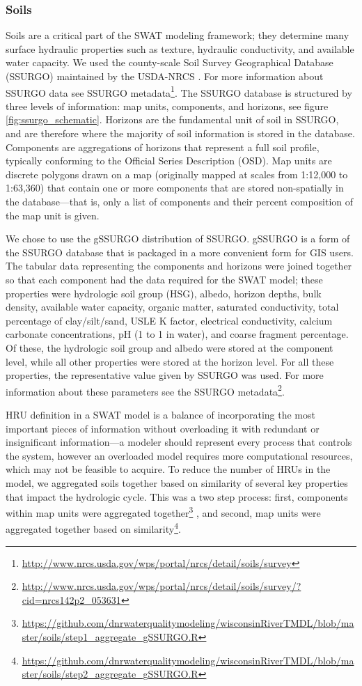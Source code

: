 \subsubsection{Soils}\label{sec:soils}
Soils are a critical part of the SWAT modeling framework; they determine many
surface hydraulic properties such as texture, hydraulic conductivity, and
available water capacity. We used the county-scale Soil Survey Geographical
Database (SSURGO) maintained by the USDA-NRCS \citep{staff_gridded_2014}. For more information about SSURGO
data see SSURGO metadata\footnote{\url{http://www.nrcs.usda.gov/wps/portal/nrcs/detail/soils/survey}}.
The SSURGO database is structured by three levels of information: map units,
components, and horizons, see figure \ref{fig:ssurgo_schematic}. Horizons are the fundamental unit of soil in SSURGO, and are
therefore where the majority of soil information is stored in the database.
Components are aggregations of horizons that represent a full soil profile,
typically conforming to the Official Series Description (OSD). Map units
are discrete polygons drawn on a map (originally mapped at scales from 1:12,000
to 1:63,360) that contain one or more components that are stored non-spatially
in the database---that is, only a list of components and their percent
composition of the map unit is given. 

We chose to use the gSSURGO distribution of SSURGO. gSSURGO is a form of the SSURGO database that is packaged in a more
convenient form for GIS users. The tabular data representing the components and
horizons were joined together so that each component had the data required for
the SWAT model; these properties were hydrologic soil group (HSG), albedo,
horizon depths, bulk density, available water capacity, organic matter,
saturated conductivity, total percentage of clay/silt/sand, USLE K factor,
electrical conductivity, calcium carbonate concentrations, pH (1 to 1 in water),
and coarse fragment percentage. Of these, the hydrologic soil group and albedo
were stored at the component level, while all other properties were stored at
the horizon level. For all these properties, the representative value given by
SSURGO was used. For more information about these parameters see the SSURGO
metadata\footnote{\url{http://www.nrcs.usda.gov/wps/portal/nrcs/detail/soils/survey/?cid=nrcs142p2_053631}}.

HRU definition in a SWAT model is a balance of incorporating the most important
pieces of information without overloading it with redundant or insignificant
information---a modeler should represent every process that controls the system,
however an overloaded model requires more computational resources, which may not
be feasible to acquire. To reduce the number of HRUs in the model, we aggregated
soils together based on similarity of several key properties that impact the
hydrologic cycle. This was a two step process: first, components within map
units were aggregated
together\footnote{\url{https://github.com/dnrwaterqualitymodeling/wisconsinRiverTMDL/blob/master/soils/step1_aggregate_gSSURGO.R} } ,
and second, map units were aggregated together based on
similarity\footnote{\url{https://github.com/dnrwaterqualitymodeling/wisconsinRiverTMDL/blob/master/soils/step2_aggregate_gSSURGO.R}}.

